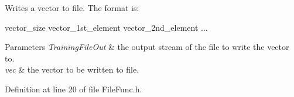 Writes a vector to file. The format is\+: 
\begin{DoxyCode}
vector\_size vector\_1st\_element vector\_2nd\_element ...
\end{DoxyCode}



\begin{DoxyParams}{Parameters}
{\em Training\+File\+Out} & the output stream of the file to write the vector to. \\
\hline
{\em vec} & the vector to be written to file. \\
\hline
\end{DoxyParams}


Definition at line 20 of file File\+Func.\+h.

